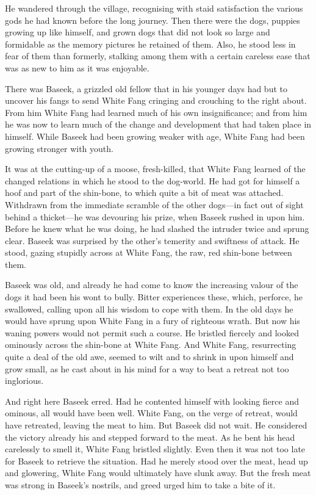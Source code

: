 \documentclass[10pt]{book}
\begin{document}
He wandered through the village, recognising with staid satisfaction
the various gods he had known before the long journey. Then there were
the dogs, puppies growing up like himself, and grown dogs that did not
look so large and formidable as the memory pictures he retained of
them. Also, he stood less in fear of them than formerly, stalking among
them with a certain careless ease that was as new to him as it was
enjoyable.

There was Baseek, a grizzled old fellow that in his younger days had
but to uncover his fangs to send White Fang cringing and crouching to
the right about. From him White Fang had learned much of his own
insignificance; and from him he was now to learn much of the change and
development that had taken place in himself. While Baseek had been
growing weaker with age, White Fang had been growing stronger with
youth.

It was at the cutting-up of a moose, fresh-killed, that White Fang
learned of the changed relations in which he stood to the dog-world. He
had got for himself a hoof and part of the shin-bone, to which quite a
bit of meat was attached. Withdrawn from the immediate scramble of the
other dogs—in fact out of sight behind a thicket—he was devouring his
prize, when Baseek rushed in upon him. Before he knew what he was
doing, he had slashed the intruder twice and sprung clear. Baseek was
surprised by the other’s temerity and swiftness of attack. He stood,
gazing stupidly across at White Fang, the raw, red shin-bone between
them.

Baseek was old, and already he had come to know the increasing valour
of the dogs it had been his wont to bully. Bitter experiences these,
which, perforce, he swallowed, calling upon all his wisdom to cope with
them. In the old days he would have sprung upon White Fang in a fury of
righteous wrath. But now his waning powers would not permit such a
course. He bristled fiercely and looked ominously across the shin-bone
at White Fang. And White Fang, resurrecting quite a deal of the old
awe, seemed to wilt and to shrink in upon himself and grow small, as he
cast about in his mind for a way to beat a retreat not too inglorious.

And right here Baseek erred. Had he contented himself with looking
fierce and ominous, all would have been well. White Fang, on the verge
of retreat, would have retreated, leaving the meat to him. But Baseek
did not wait. He considered the victory already his and stepped forward
to the meat. As he bent his head carelessly to smell it, White Fang
bristled slightly. Even then it was not too late for Baseek to retrieve
the situation. Had he merely stood over the meat, head up and
glowering, White Fang would ultimately have slunk away. But the fresh
meat was strong in Baseek’s nostrils, and greed urged him to take a
bite of it.
\end{document}

